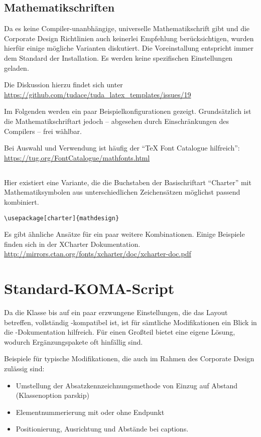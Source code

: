 \documentclass[
	ngerman,
	accentcolor=9c,%
	]{tudapub}
\begin{document}
\subsection{Mathematikschriften}
Da es keine Compiler-unanbhängige, universelle Mathematikschrift gibt und die Corporate Design Richtlinien auch keinerlei Empfehlung berücksichtigen, wurden hierfür einige mögliche Varianten diskutiert. Die Voreinstallung entspricht immer dem Standard der Installation. Es werden keine spezifischen Einstellungen geladen.

Die Diskussion hierzu findet sich unter \url{https://github.com/tudace/tuda_latex_templates/issues/19}

Im Folgenden werden ein paar Beispielkonfigurationen gezeigt. Grundsätzlich ist die Mathematikschriftart jedoch -- abgesehen durch Einschränkungen des Compilers -- frei wählbar.

Bei Auswahl und Verwendung ist häufig der \enquote{\TeX{} Font Catalogue hilfreich}: \url{https://tug.org/FontCatalogue/mathfonts.html}

\subsection{}
Hier existiert eine Variante, die die Buchstaben der Basischriftart \enquote{Charter} mit Mathematiksymbolen aus unterschiedlichen Zeichensätzen möglichst passend kombiniert.

\begin{verbatim}
\usepackage[charter]{mathdesign}
\end{verbatim}

Es gibt ähnliche Ansätze für ein paar weitere Kombinationen. Einige Beispiele finden sich in der XCharter Dokumentation. \url{http://mirrors.ctan.org/fonts/xcharter/doc/xcharter-doc.pdf}


\section{Standard-KOMA-Script}
\label{sec:KOMA}
Da die Klasse bis auf ein paar erzwungene Einstellungen, die das Layout betreffen, vollständig \KOMAScript-kompatibel ist, ist für sämtliche Modifikationen ein Blick in die \KOMAScript-Dokumentation hilfreich. Für einen Großteil bietet \KOMAScript{} eine eigene Lösung, wodurch Ergänzungspakete oft hinfällig sind.

Beispiele für typische Modifikationen, die auch im Rahmen des Corporate Design zulässig sind:
\begin{itemize}
	\item Umstellung der Absatzkennzeichnungsmethode von Einzug auf Abstand (Klassenoption parskip)
	\item Elementnummerierung mit oder ohne Endpunkt
	\item Positionierung, Ausrichtung und Abstände bei captions.
\end{itemize}
\end{document}
